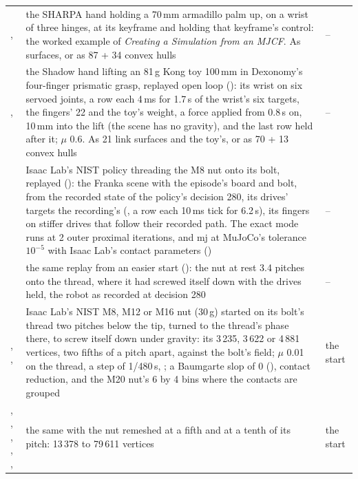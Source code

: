 \begin{longtable}{@{}L{44mm}L{92mm}L{17mm}@{}}
,  & the SHARPA hand holding a 70\,mm armadillo palm up, on a wrist of three hinges, at its keyframe  and holding that keyframe's control: the worked example of \emph{Creating a Simulation from an MJCF}. As surfaces, or as 87 + 34 convex hulls & -- \\
,  & the Shadow hand lifting an 81\,g Kong toy 100\,mm in Dexonomy's four-finger prismatic grasp, replayed open loop (): its wrist on six servoed joints, a  row each 4\,ms for 1.7\,s of the wrist's six targets, the fingers' 22 and the toy's weight, a force applied from 0.8\,s on, 10\,mm into the lift (the scene has no gravity), and the last row held after it; $\mu$ 0.6. As 21 link surfaces and the toy's, or as 70 + 13 convex hulls & -- \\
 & Isaac Lab's NIST policy threading the M8 nut onto its bolt, replayed (): the Franka scene with the episode's board and bolt, from the recorded state of the policy's decision 280, its drives' targets the recording's (, a row each 10\,ms tick for 6.2\,s), its fingers on stiffer drives that follow their recorded path. The exact mode runs at 2 outer proximal iterations, and mj at MuJoCo's tolerance $10^{-5}$ with Isaac Lab's contact parameters () & -- \\
 & the same replay from an easier start (): the nut at rest 3.4 pitches onto the thread, where it had screwed itself down with the drives held, the robot as recorded at decision 280 & -- \\
, ,  & Isaac Lab's NIST M8, M12 or M16 nut (30\,g) started on its bolt's thread two pitches below the tip, turned to the thread's phase there, to screw itself down under gravity: its 3\,235, 3\,622 or 4\,881 vertices, two fifths of a pitch apart, against the bolt's field; $\mu$ 0.01 on the thread, a step of 1/480\,s, ; a Baumgarte slop of 0 (), contact reduction, and the M20 nut's 6 by 4 bins where the contacts are grouped & the start \\
, , , , ,  & the same with the nut remeshed at a fifth and at a tenth of its pitch: 13\,378 to 79\,611 vertices & the start \\

\end{longtable}
